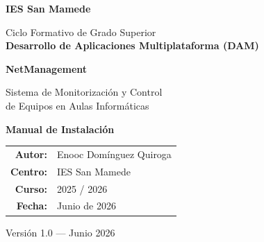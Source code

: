 \documentclass[12pt,a4paper]{article}
\begin{document}
\begin{titlepage}
  \thispagestyle{empty}
  \centering

  \vspace*{1cm}

  {\large\bfseries\color{secondary} IES San Mamede\par}
  \vspace{0.3cm}
  {\normalsize Ciclo Formativo de Grado Superior\\[0.15cm]
  \textbf{Desarrollo de Aplicaciones Multiplataforma (DAM)}\par}

  \vspace{1.5cm}

  {\Huge\bfseries\color{primary} NetManagement\par}
  \vspace{0.6cm}
  {\LARGE Sistema de Monitorización y Control\\de Equipos en Aulas Informáticas\par}

  \vspace{1.5cm}


  \vspace{1.5cm}

  {\Large\bfseries Manual de Instalación\par}

  \vspace{2cm}

  \begin{tabular}{rl}
    \textbf{Autor:}  & Enooc Domínguez Quiroga \\[0.3cm]
    \textbf{Centro:} & IES San Mamede \\[0.3cm]
    \textbf{Curso:}  & 2025 / 2026 \\[0.3cm]
    \textbf{Fecha:}  & Junio de 2026 \\
  \end{tabular}

  \vfill

  {\small Versión 1.0 --- Junio 2026\par}
\end{titlepage}

\newpage
\thispagestyle{empty}
\tableofcontents
\newpage
\end{document}

